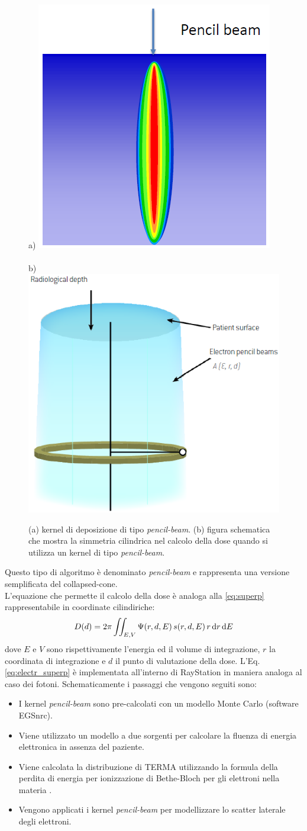 {\begin{figure}
\centering
a) \includegraphics[width=.44\textwidth]{./cap1/electr_pencil.png}$\qquad$\\
b) \includegraphics[width=.44\textwidth]{./cap1/electr_pencil_b.png}
\caption{(a) kernel di deposizione di tipo \textit{pencil-beam}. (b) figura schematica che mostra la simmetria cilindrica nel calcolo della dose quando si utilizza un kernel di tipo \textit{pencil-beam}.}
\label{fig:electr_pencil}
\end{figure}


Questo tipo di algoritmo è denominato \textit{pencil-beam} e rappresenta una versione semplificata del collapsed-cone.\\
L'equazione che permette il calcolo della dose è analoga alla \eqref{eq:superp} rappresentabile in coordinate cilindiriche:
\begin{equation}
\label{eq:electr_superp}
D(d) = 2\pi \iint_{E,V} \Psi(r,d,E)\, s(r,d,E)\, r\,\text{d} r \,\text{d} E
\end{equation}
dove $E$ e $V$ sono rispettivamente l'energia ed il volume di integrazione, $r$ la coordinata di integrazione e $d$ il punto di valutazione della dose.
L'Eq.\eqref{eq:electr_superp} è implementata all'interno di RayStation in maniera analoga al caso dei fotoni. Schematicamente i passaggi che vengono seguiti sono:
\begin{itemize}
\item I kernel \textit{pencil-beam} sono pre-calcolati con un modello Monte Carlo (software EGSnrc).
\item Viene utilizzato un modello a due sorgenti per calcolare la fluenza di energia elettronica in assenza del paziente.
\item Viene calcolata la distribuzione di TERMA utilizzando la formula della perdita di energia per ionizzazione di Bethe-Bloch per gli elettroni nella materia \cite{RaySearchLaboratories2014}.
\item Vengono applicati i kernel \textit{pencil-beam} per modellizzare lo scatter laterale degli elettroni.
\end{itemize}

}
